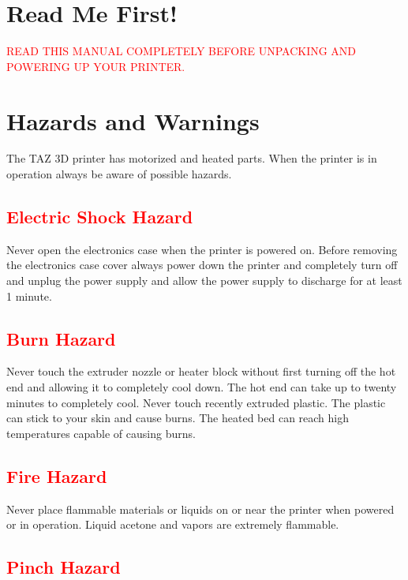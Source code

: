 \section{Read Me First!}
\textcolor{red}{READ THIS MANUAL COMPLETELY BEFORE UNPACKING AND POWERING UP YOUR PRINTER.}

\section{Hazards and Warnings}

The TAZ 3D printer has motorized and heated parts. When the printer is in operation always be aware of possible hazards.

\subsection{\textcolor{red}{Electric Shock Hazard}}
Never open the electronics case when the printer is powered on. Before removing the electronics case cover always power down the printer and completely turn off and unplug the power supply and allow the power supply to discharge for at least 1 minute.

\subsection{\textcolor{red}{Burn Hazard}}
Never touch the extruder nozzle or heater block without first turning off the hot end and allowing it to completely cool down. The hot end can take up to twenty minutes to completely cool. Never touch recently extruded plastic. The plastic can stick to your skin and cause burns. The heated bed can reach high temperatures capable of causing burns.

\subsection{\textcolor{red}{Fire Hazard}}
Never place flammable materials or liquids on or near the printer when powered or in operation. Liquid acetone and vapors are extremely flammable.

\subsection{\textcolor{red}{Pinch Hazard}}

